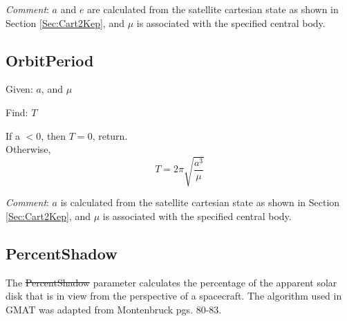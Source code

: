 \noindent \textit{Comment}:  $a$ and $e$ are calculated from the
satellite cartesian state as shown in Section \ref{Sec:Cart2Kep},
and $\mu$ is associated with the specified central body.


\subsection{OrbitPeriod}

Given:  $a$, and $\mu$

\noindent Find:  $T$

\noindent If a $ < 0$,  then $T = 0$, return.\\
%


\noindent Otherwise,
\begin{equation}
    T = 2\pi\sqrt{\frac{a^3}{\mu}}
\end{equation}

\noindent \textit{Comment}:  $a$ is calculated from the satellite
cartesian state as shown in Section \ref{Sec:Cart2Kep}, and $\mu$ is
associated with the specified central body.

\subsection{PercentShadow } \label{sec:PercentShadow}

The \st{PercentShadow} parameter calculates the percentage of the
apparent solar disk that is in view from the perspective of a
spacecraft. The algorithm used in GMAT was adapted from
Montenbruck\cite{Montenbruck:Gill:05} pgs. 80-83.

